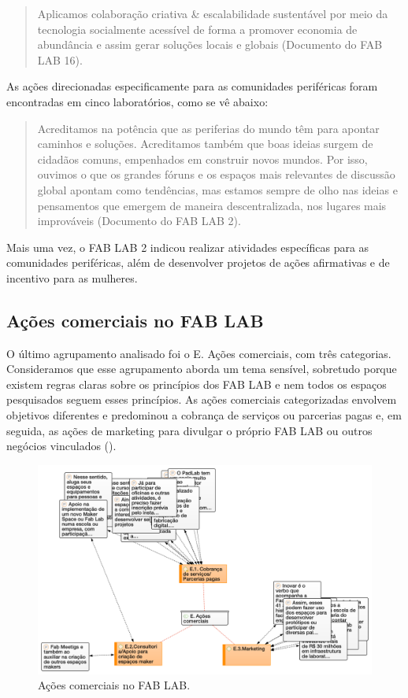 \documentclass[portuguese]{textolivre}
\begin{document}
\begin{quote}
    Aplicamos colaboração criativa \& escalabilidade sustentável por meio da tecnologia socialmente acessível de forma a promover economia de abundância e assim gerar soluções locais e globais (Documento do FAB LAB 16).
\end{quote}

As ações direcionadas especificamente para as comunidades periféricas foram encontradas em cinco laboratórios, como se vê abaixo:

\begin{quote}
    Acreditamos na potência que as periferias do mundo têm para apontar caminhos e soluções. Acreditamos também que boas ideias surgem de cidadãos comuns, empenhados em construir novos mundos. Por isso, ouvimos o que os grandes fóruns e os espaços mais relevantes de discussão global apontam como tendências, mas estamos sempre de olho nas ideias e pensamentos que emergem de maneira descentralizada, nos lugares mais improváveis (Documento do FAB LAB 2).
\end{quote}

Mais uma vez, o FAB LAB 2 indicou realizar atividades específicas para as comunidades periféricas, além de desenvolver projetos de ações afirmativas e de incentivo para as mulheres.

\subsection{Ações comerciais no FAB LAB}\label{sec-titulo}
O último agrupamento analisado foi o E. Ações comerciais, com três categorias. Consideramos que esse agrupamento aborda um tema sensível, sobretudo porque existem regras claras sobre os princípios dos FAB LAB e nem todos os espaços pesquisados seguem esses princípios. As ações comerciais categorizadas envolvem objetivos diferentes e predominou a cobrança de serviços ou parcerias pagas e, em seguida, as ações de marketing para divulgar o próprio FAB LAB ou outros negócios vinculados ().

\begin{figure}[htbp]
\centering
\begin{minipage}{\textwidth}
\includegraphics[width=\linewidth]{Fig7.png}
\caption{Ações comerciais no FAB LAB.}
\label{fig7}
\end{minipage}
\end{figure}
\end{document}
